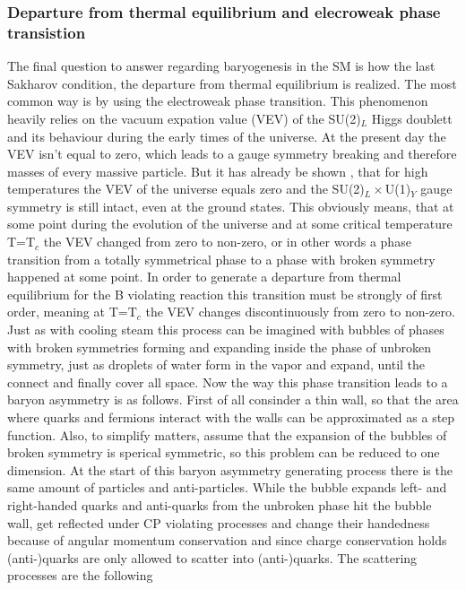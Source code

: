 \subsubsection{Departure from thermal equilibrium and elecroweak phase transistion} The final question to answer regarding baryogenesis in the SM is how the last Sakharov condition, the departure from thermal equilibrium is realized. The most common way is by using the electroweak phase transition. \newline
This phenomenon heavily relies on the vacuum expation value (VEV) of the SU(2)$_L$ Higgs doublett and its behaviour during the early times of the universe. At the present day the VEV isn't equal to zero, which leads to a gauge symmetry breaking and therefore masses of every massive particle. But it has already be shown \cite[Ref. 32]{Bernreuther:2002uj}, that for high temperatures the VEV of the universe equals zero and the SU(2)$_L\times$U(1)$_Y$ gauge symmetry is still intact, even at the ground states. This obviously means, that at some point during the evolution of the universe and at some critical temperature T=T$_c$ the VEV changed from zero to non-zero, or in other words a phase transition from a totally symmetrical phase to a phase with broken symmetry happened at some point. In order to generate a departure from thermal equilibrium for the B violating reaction this transition must be strongly of first order, meaning at T=T$_c$ the VEV changes discontinuously from zero to non-zero. \newline
Just as with cooling steam this process can be imagined with bubbles of phases with broken symmetries forming and expanding inside the phase of unbroken symmetry, just as droplets of water form in the vapor and expand, until the connect and finally cover all space. Now the way this phase transition leads to a baryon asymmetry is as follows. \newline
First of all consinder a thin wall, so that the area where quarks and fermions interact with the walls can be approximated as a step function. Also, to simplify matters, assume that the expansion of the bubbles of broken symmetry is sperical symmetric, so this problem can be reduced to one dimension. \newline
At the start of this baryon asymmetry generating process there is the same amount of particles and anti-particles. \newline
While the bubble expands left- and right-handed quarks and anti-quarks from the unbroken phase hit the bubble wall, get reflected under CP violating processes and change their handedness because of angular momentum conservation and since charge conservation holds (anti-)quarks are only allowed to scatter into (anti-)quarks. The scattering processes are the following
